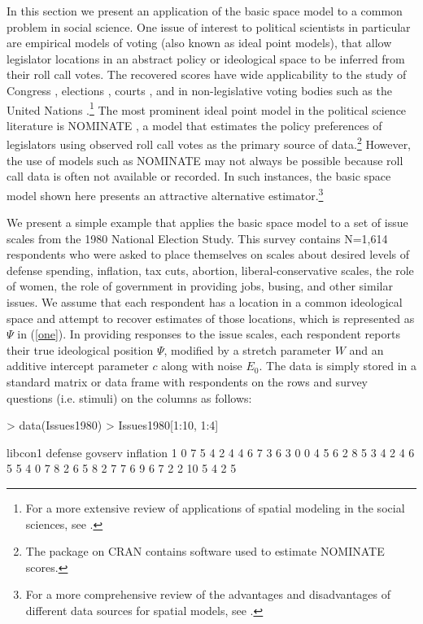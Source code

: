 \documentclass[nojss]{jss}
\begin{document}
In this section we present an application of the basic space model to a common problem in social science.
One issue of interest to political scientists in particular are empirical models of voting (also
known as ideal point models), that allow legislator locations in an abstract policy or ideological space
to be inferred from their roll call votes. The recovered scores have wide applicability to the study
of Congress \citep{Congress, app1}, elections \citep{herronlewis},
courts \citep{martin2002dynamic}, and in non-legislative voting bodies such as the United
Nations \citep{Voeten}.\footnote{For a more extensive review of applications of spatial modeling
in the social sciences, see \citet{poole2005spatial}.}  The most prominent ideal point model in the political
science literature is NOMINATE \citep{Congress}, a model that estimates the policy
preferences of legislators using observed roll call votes as the primary source of data.\footnote{The
 package on CRAN contains software used to estimate NOMINATE scores.}  However, the
use of models such as NOMINATE may not always be possible because roll call data is often not
available or recorded.  In such instances, the basic space model shown here presents an attractive
alternative estimator.\footnote{For a more comprehensive review of the advantages and disadvantages
of different data sources for spatial models, see \citet{saiegh2009recovering}.}

We present a simple example that applies the basic space model to a set of issue scales from the
1980 National Election Study. This survey contains N=1,614 respondents who were asked to place themselves
on scales about desired levels of defense spending, inflation, tax cuts, abortion, liberal-conservative
scales, the role of women, the role of government in providing jobs, busing, and other similar issues.
We assume that each respondent has a location in a common ideological space and attempt to recover
estimates of those locations, which is represented as $\Psi$ in (\ref{one}). In providing responses
to the issue scales, each respondent reports their true ideological position $\Psi$, modified by a
stretch parameter $W$ and an additive intercept parameter $c$ along with noise $E_0$. The data is simply
stored in a standard matrix or data frame with respondents on the rows and survey questions (i.e. stimuli)
on the columns as follows:

\begin{Schunk}
\begin{Sinput}
> data(Issues1980)
> Issues1980[1:10, 1:4]
\end{Sinput}
\begin{Soutput}
   libcon1 defense govserv inflation
1        0       7       5         4
2        4       4       6         7
3        6       3       0         0
4        5       6       2         8
5        3       4       2         4
6        5       5       4         0
7        8       2       6         5
8        2       7       7         6
9        6       7       2         2
10       5       4       2         5
\end{Soutput}
\end{Schunk}
\end{document}
